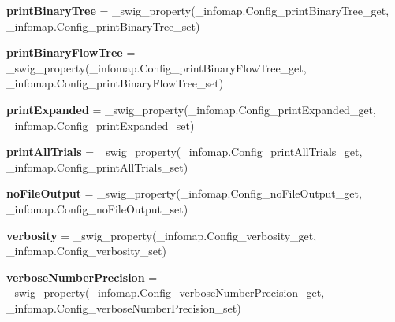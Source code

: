 \begin{DoxyCompactItemize}
\item 
\mbox{\label{classinfomapfolder_1_1infomap_1_1Config_a4bf95505e8599f3336474a196e24a83d}} 
{\bfseries print\+Binary\+Tree} = \+\_\+swig\+\_\+property(\+\_\+infomap.\+Config\+\_\+print\+Binary\+Tree\+\_\+get, \+\_\+infomap.\+Config\+\_\+print\+Binary\+Tree\+\_\+set)
\item 
\mbox{\label{classinfomapfolder_1_1infomap_1_1Config_a58c21eb68f5e31dd2783c8882f392a5c}} 
{\bfseries print\+Binary\+Flow\+Tree} = \+\_\+swig\+\_\+property(\+\_\+infomap.\+Config\+\_\+print\+Binary\+Flow\+Tree\+\_\+get, \+\_\+infomap.\+Config\+\_\+print\+Binary\+Flow\+Tree\+\_\+set)
\item 
\mbox{\label{classinfomapfolder_1_1infomap_1_1Config_a6ca087b4e930a602c0b87730e4338a5d}} 
{\bfseries print\+Expanded} = \+\_\+swig\+\_\+property(\+\_\+infomap.\+Config\+\_\+print\+Expanded\+\_\+get, \+\_\+infomap.\+Config\+\_\+print\+Expanded\+\_\+set)
\item 
\mbox{\label{classinfomapfolder_1_1infomap_1_1Config_acfe0d4bb67bbe9b6b524ba55d5f8bb6c}} 
{\bfseries print\+All\+Trials} = \+\_\+swig\+\_\+property(\+\_\+infomap.\+Config\+\_\+print\+All\+Trials\+\_\+get, \+\_\+infomap.\+Config\+\_\+print\+All\+Trials\+\_\+set)
\item 
\mbox{\label{classinfomapfolder_1_1infomap_1_1Config_a6303008b37e9d38fa1e94a868f0ade8b}} 
{\bfseries no\+File\+Output} = \+\_\+swig\+\_\+property(\+\_\+infomap.\+Config\+\_\+no\+File\+Output\+\_\+get, \+\_\+infomap.\+Config\+\_\+no\+File\+Output\+\_\+set)
\item 
\mbox{\label{classinfomapfolder_1_1infomap_1_1Config_acc3d82756c41c2bb398fbd89dde35171}} 
{\bfseries verbosity} = \+\_\+swig\+\_\+property(\+\_\+infomap.\+Config\+\_\+verbosity\+\_\+get, \+\_\+infomap.\+Config\+\_\+verbosity\+\_\+set)
\item 
\mbox{\label{classinfomapfolder_1_1infomap_1_1Config_a0fa0194a197cfeda370fd5e371d3569b}} 
{\bfseries verbose\+Number\+Precision} = \+\_\+swig\+\_\+property(\+\_\+infomap.\+Config\+\_\+verbose\+Number\+Precision\+\_\+get, \+\_\+infomap.\+Config\+\_\+verbose\+Number\+Precision\+\_\+set)

\end{DoxyCompactItemize}
